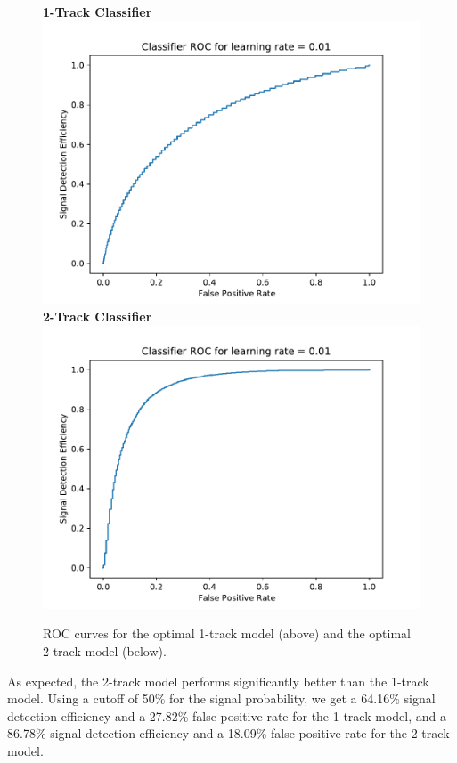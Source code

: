 \documentclass[12pt, letterpaper]{article}
\begin{document}
\begin{figure}
\begin{center}
\textbf{1-Track Classifier}\\
\includegraphics[width=0.87 \textwidth]{oneTrackRoc.pdf}\\
\textbf{2-Track Classifier}\\
\includegraphics[width=0.87 \textwidth]{twoTrackRoc.pdf}\\
\end{center}

\caption{ROC curves for the optimal 1-track model (above) and the optimal 2-track model (below).}
\label{fig:roc1}
\end{figure}


As expected, the 2-track model performs significantly better than the 1-track model. Using a cutoff of 50\% for the signal probability, we get a 64.16\% signal detection efficiency and a 27.82\% false positive rate for the 1-track model, and a 86.78\% signal detection efficiency and a 18.09\% false positive rate for the 2-track model.
\end{document}
